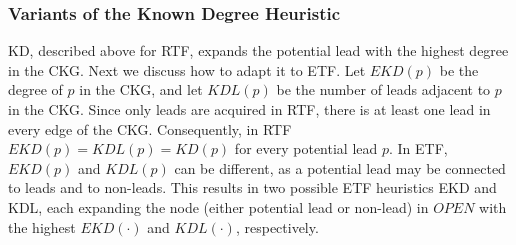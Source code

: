 \documentclass[journal]{IEEEtran}
\newcommand{\islead}[1]{{\em IsLead(#1)}}
\begin{document}




\subsubsection{Variants of the Known Degree Heuristic}
KD, described above for RTF, expands the potential lead with the highest degree
in the CKG.
Next we discuss how to adapt it to ETF. Let $EKD(p)$ be the degree of $p$ in the
CKG, and let $KDL(p)$  be the number of leads adjacent to $p$ in the CKG.
Since only leads are acquired in RTF, there is at least one lead in every edge
of the CKG. Consequently, in RTF $EKD(p)=KDL(p)=KD(p)$ for every potential lead $p$.
In ETF, $EKD(p)$ and $KDL(p)$ can be different, as a potential lead may be connected to leads and to non-leads. This results in two possible ETF heuristics EKD and KDL, each expanding the node (either potential lead or
non-lead) in $OPEN$ with the highest $EKD(\cdot)$ and $KDL(\cdot)$, respectively.
\end{document}
